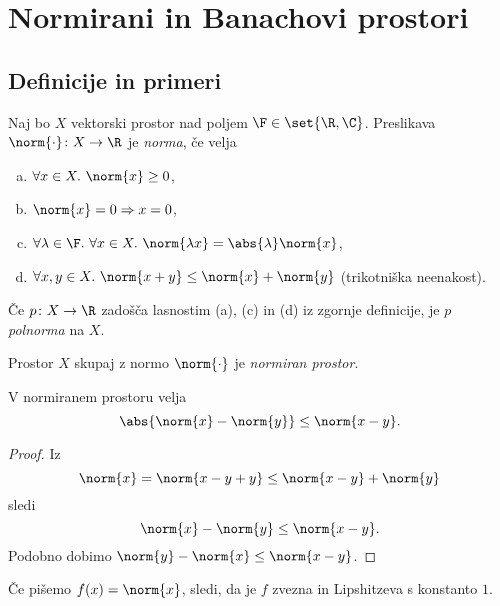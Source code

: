 \section{Normirani in Banachovi prostori}
\subsection{Definicije in primeri}


\begin{definicija}
    Naj bo $X$ vektorski prostor nad poljem $\F \in \set{\R, \C}$. Preslikava 
    $\norm{\cdot} \colon X \to \R$ je \emph{norma}, če velja
    \begin{enumerate}[(a)]
        \item $\forall x \in X.~\norm{x} \ge 0$,
        \item $\norm{x} = 0 \Rightarrow x = 0$,
        \item $\forall \lambda \in \F.~\forall x \in X.~\norm{\lambda x} = \abs{\lambda} \norm{x}$,
        \item $\forall x, y \in X.~\norm{x+y} \le \norm{x} + \norm{y}$ (trikotniška neenakost).
    \end{enumerate}
\end{definicija}

\begin{definicija}
    Če $p\colon X \to \R$ zadošča lasnostim (a), (c) in (d) iz zgornje definicije, 
    je $p$ \emph{polnorma} na $X$.
\end{definicija}

\begin{definicija}
    Prostor $X$ skupaj z normo $\norm{\cdot}$ je \emph{normiran prostor}.
\end{definicija}

\begin{lema}
    V normiranem prostoru velja
    \[
        \abs{\norm{x} - \norm{y}} \le \norm{x-y}.
    \]
\end{lema}

\begin{proof}
    Iz
    \[
        \norm{x} = \norm{x-y+y} \le \norm{x-y} + \norm{y}
    \]
    sledi
    \[
        \norm{x} - \norm{y} \le \norm{x-y}.
    \]
    Podobno dobimo $\norm{y} - \norm{x} \le \norm{x-y}$.
\end{proof}

Če pišemo $f(x) = \norm{x}$, sledi, da je $f$ zvezna in Lipshitzeva 
s konstanto $1$.

